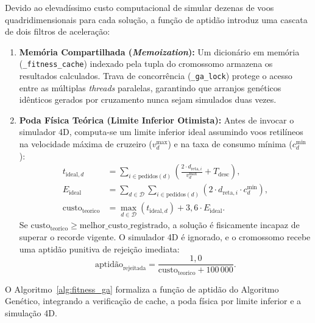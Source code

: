 Devido ao elevadíssimo custo computacional de simular dezenas de voos quadridimensionais para cada solução, a função de aptidão introduz uma cascata de dois filtros de aceleração:
\begin{enumerate}
    \item \textbf{Memória Compartilhada (\textit{Memoization}):} Um dicionário em memória (\texttt{\_fitness\_cache}) indexado pela tupla do cromossomo armazena os resultados calculados. Trava de concorrência (\texttt{\_ga\_lock}) protege o acesso entre as múltiplas \textit{threads} paralelas, garantindo que arranjos genéticos idênticos gerados por cruzamento nunca sejam simulados duas vezes.
    \item \textbf{Poda Física Teórica (Limite Inferior Otimista):} Antes de invocar o simulador 4D, computa-se um limite inferior ideal assumindo voos retilíneos na velocidade máxima de cruzeiro ($v^{\text{max}}_d$) e na taxa de consumo mínima ($c^{\text{min}}_d$):
    \begin{align}
    t_{\text{ideal}, d} &= \sum_{i \in \text{pedidos}(d)} \left( \frac{2 \cdot d_{\text{reta}, i}}{v^{\text{max}}_d} + T_{\text{desc}} \right), \label{eq:t_ideal} \\
    E_{\text{ideal}} &= \sum_{d \in \mathcal{D}} \sum_{i \in \text{pedidos}(d)} \left( 2 \cdot d_{\text{reta}, i} \cdot c^{\text{min}}_d \right), \label{eq:e_ideal} \\
    \text{custo}_{\text{teorico}} &= \max_{d \in \mathcal{D}}(t_{\text{ideal}, d}) + 3{,}6 \cdot E_{\text{ideal}}. \label{eq:custo_teorico}
    \end{align}
    Se $\text{custo}_{\text{teorico}} \ge \text{melhor\_custo\_registrado}$, a solução é fisicamente incapaz de superar o recorde vigente. O simulador 4D é ignorado, e o cromossomo recebe uma aptidão punitiva de rejeição imediata:
    \begin{equation}\label{eq:fitness_rejeitado}
    \text{aptidão}_{\text{rejeitada}} = \frac{1{,}0}{\text{custo}_{\text{teorico}} + 100\,000}.
    \end{equation}
\end{enumerate}

O Algoritmo~\ref{alg:fitness_ga} formaliza a função de aptidão do Algoritmo Genético, integrando a verificação de cache, a poda física por limite inferior e a simulação 4D.


